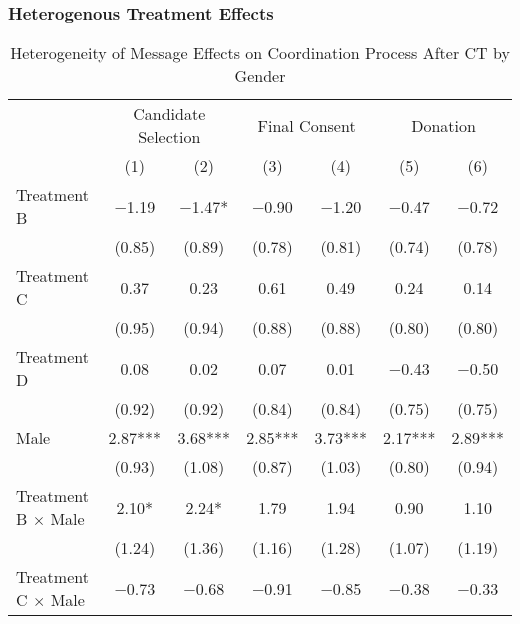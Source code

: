 \documentclass[12pt, a4paper]{article}
\begin{document}
\hypertarget{heterogenous-treatment-effects}{%
\subsubsection{Heterogenous Treatment Effects}\label{heterogenous-treatment-effects}}

\begin{table}[H]

\caption{\label{tab:lm-interaction-gender-coordinate}Heterogeneity of Message Effects on Coordination Process After CT by Gender}
\centering
\fontsize{8}{10}\selectfont
\begin{threeparttable}
\begin{tabular}[t]{lcccccc}
\toprule
\multicolumn{1}{c}{ } & \multicolumn{2}{c}{Candidate Selection} & \multicolumn{2}{c}{Final Consent} & \multicolumn{2}{c}{Donation} \\
\cmidrule(l{3pt}r{3pt}){2-3} \cmidrule(l{3pt}r{3pt}){4-5} \cmidrule(l{3pt}r{3pt}){6-7}
  & (1) & (2) & (3) & (4) & (5) & (6)\\
\midrule
Treatment B & \num{-1.19} & \num{-1.47}* & \num{-0.90} & \num{-1.20} & \num{-0.47} & \num{-0.72}\\
 & (\num{0.85}) & (\num{0.89}) & (\num{0.78}) & (\num{0.81}) & (\num{0.74}) & (\num{0.78})\\
Treatment C & \num{0.37} & \num{0.23} & \num{0.61} & \num{0.49} & \num{0.24} & \num{0.14}\\
 & (\num{0.95}) & (\num{0.94}) & (\num{0.88}) & (\num{0.88}) & (\num{0.80}) & (\num{0.80})\\
Treatment D & \num{0.08} & \num{0.02} & \num{0.07} & \num{0.01} & \num{-0.43} & \num{-0.50}\\
 & (\num{0.92}) & (\num{0.92}) & (\num{0.84}) & (\num{0.84}) & (\num{0.75}) & (\num{0.75})\\
Male & \num{2.87}*** & \num{3.68}*** & \num{2.85}*** & \num{3.73}*** & \num{2.17}*** & \num{2.89}***\\
 & (\num{0.93}) & (\num{1.08}) & (\num{0.87}) & (\num{1.03}) & (\num{0.80}) & (\num{0.94})\\
Treatment B $\times$ Male & \num{2.10}* & \num{2.24}* & \num{1.79} & \num{1.94} & \num{0.90} & \num{1.10}\\
 & (\num{1.24}) & (\num{1.36}) & (\num{1.16}) & (\num{1.28}) & (\num{1.07}) & (\num{1.19})\\
Treatment C $\times$ Male & \num{-0.73} & \num{-0.68} & \num{-0.91} & \num{-0.85} & \num{-0.38} & \num{-0.33}\\

\end{tabular}
\end{threeparttable}
\end{table}
\end{document}
